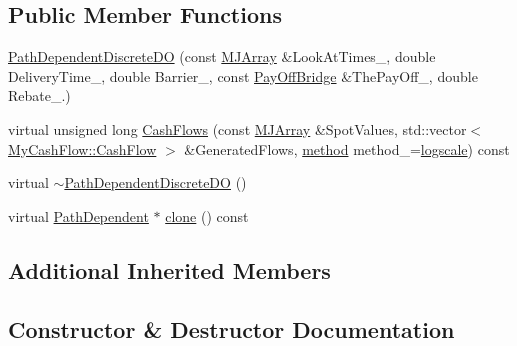 \subsection*{Public Member Functions}
\begin{DoxyCompactItemize}
\item 
\hyperlink{classPathDependentDiscreteDO_af6925c0ca1c162d48eb8ba4f663fd908}{Path\+Dependent\+Discrete\+DO} (const \hyperlink{classMJArray}{M\+J\+Array} \&Look\+At\+Times\+\_\+, double Delivery\+Time\+\_\+, double Barrier\+\_\+, const \hyperlink{classPayOffBridge}{Pay\+Off\+Bridge} \&The\+Pay\+Off\+\_\+, double Rebate\+\_.)
\item 
virtual unsigned long \hyperlink{classPathDependentDiscreteDO_aaf15433cd3271c6af5cacf91ac154811}{Cash\+Flows} (const \hyperlink{classMJArray}{M\+J\+Array} \&Spot\+Values, std\+::vector$<$ \hyperlink{classMyCashFlow_1_1CashFlow}{My\+Cash\+Flow\+::\+Cash\+Flow} $>$ \&Generated\+Flows, \hyperlink{PathDependent_8h_abed946c62f140eb7ff2ac742e6ad9497}{method} method\+\_\+=\hyperlink{PathDependent_8h_abed946c62f140eb7ff2ac742e6ad9497a064d3d3358889658ce07fe9f3191d1fd}{logscale}) const
\item 
virtual \hyperlink{classPathDependentDiscreteDO_a3da858fb81986c7a34c04479c631532b}{$\sim$\+Path\+Dependent\+Discrete\+DO} ()
\item 
virtual \hyperlink{classPathDependent}{Path\+Dependent} $\ast$ \hyperlink{classPathDependentDiscreteDO_a3de80a8fddb9ef29bf3ed6e97004fc0c}{clone} () const
\end{DoxyCompactItemize}
\subsection*{Additional Inherited Members}


\subsection{Constructor \& Destructor Documentation}
\hypertarget{classPathDependentDiscreteDO_af6925c0ca1c162d48eb8ba4f663fd908}{}\label{classPathDependentDiscreteDO_af6925c0ca1c162d48eb8ba4f663fd908} 
